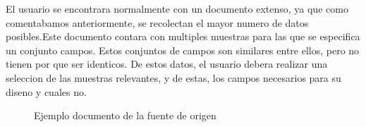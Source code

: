 El usuario se encontrara normalmente con un documento extenso, ya que como comentabamos anteriormente, se recolectan
el mayor numero de datos posibles.Este documento contara con multiples muestras para las que
se especifica un conjunto campos. Estos conjuntos de campos son similares entre ellos, pero no tienen por que ser identicos. 
De estos datos, el usuario debera realizar una seleccion de las muestras relevantes, y de estas, los campos necesarios
para su diseno y cuales no.
\begin{figure}[h]
    

\centering
{}
\caption{Ejemplo documento de la fuente de origen}
\end{figure}
 
